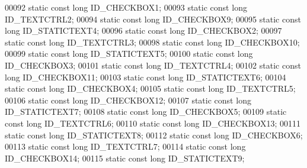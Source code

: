 \begin{DoxyCode}
00092     \textcolor{keyword}{static} \textcolor{keyword}{const} \textcolor{keywordtype}{long} ID_CHECKBOX1;
00093     \textcolor{keyword}{static} \textcolor{keyword}{const} \textcolor{keywordtype}{long} ID_TEXTCTRL2;
00094     \textcolor{keyword}{static} \textcolor{keyword}{const} \textcolor{keywordtype}{long} ID_CHECKBOX9;
00095     \textcolor{keyword}{static} \textcolor{keyword}{const} \textcolor{keywordtype}{long} ID_STATICTEXT4;
00096     \textcolor{keyword}{static} \textcolor{keyword}{const} \textcolor{keywordtype}{long} ID_CHECKBOX2;
00097     \textcolor{keyword}{static} \textcolor{keyword}{const} \textcolor{keywordtype}{long} ID_TEXTCTRL3;
00098     \textcolor{keyword}{static} \textcolor{keyword}{const} \textcolor{keywordtype}{long} ID_CHECKBOX10;
00099     \textcolor{keyword}{static} \textcolor{keyword}{const} \textcolor{keywordtype}{long} ID_STATICTEXT5;
00100     \textcolor{keyword}{static} \textcolor{keyword}{const} \textcolor{keywordtype}{long} ID_CHECKBOX3;
00101     \textcolor{keyword}{static} \textcolor{keyword}{const} \textcolor{keywordtype}{long} ID_TEXTCTRL4;
00102     \textcolor{keyword}{static} \textcolor{keyword}{const} \textcolor{keywordtype}{long} ID_CHECKBOX11;
00103     \textcolor{keyword}{static} \textcolor{keyword}{const} \textcolor{keywordtype}{long} ID_STATICTEXT6;
00104     \textcolor{keyword}{static} \textcolor{keyword}{const} \textcolor{keywordtype}{long} ID_CHECKBOX4;
00105     \textcolor{keyword}{static} \textcolor{keyword}{const} \textcolor{keywordtype}{long} ID_TEXTCTRL5;
00106     \textcolor{keyword}{static} \textcolor{keyword}{const} \textcolor{keywordtype}{long} ID_CHECKBOX12;
00107     \textcolor{keyword}{static} \textcolor{keyword}{const} \textcolor{keywordtype}{long} ID_STATICTEXT7;
00108     \textcolor{keyword}{static} \textcolor{keyword}{const} \textcolor{keywordtype}{long} ID_CHECKBOX5;
00109     \textcolor{keyword}{static} \textcolor{keyword}{const} \textcolor{keywordtype}{long} ID_TEXTCTRL6;
00110     \textcolor{keyword}{static} \textcolor{keyword}{const} \textcolor{keywordtype}{long} ID_CHECKBOX13;
00111     \textcolor{keyword}{static} \textcolor{keyword}{const} \textcolor{keywordtype}{long} ID_STATICTEXT8;
00112     \textcolor{keyword}{static} \textcolor{keyword}{const} \textcolor{keywordtype}{long} ID_CHECKBOX6;
00113     \textcolor{keyword}{static} \textcolor{keyword}{const} \textcolor{keywordtype}{long} ID_TEXTCTRL7;
00114     \textcolor{keyword}{static} \textcolor{keyword}{const} \textcolor{keywordtype}{long} ID_CHECKBOX14;
00115     \textcolor{keyword}{static} \textcolor{keyword}{const} \textcolor{keywordtype}{long} ID_STATICTEXT9;

\end{DoxyCode}
